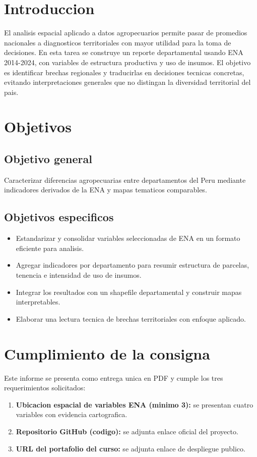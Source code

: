 \documentclass[11pt,a4paper]{article}
\begin{document}
\newpage
\tableofcontents
\newpage

\section{Introduccion}
El analisis espacial aplicado a datos agropecuarios permite pasar de promedios nacionales a diagnosticos territoriales con mayor utilidad para la toma de decisiones. En esta tarea se construye un reporte departamental usando ENA 2014-2024, con variables de estructura productiva y uso de insumos. El objetivo es identificar brechas regionales y traducirlas en decisiones tecnicas concretas, evitando interpretaciones generales que no distingan la diversidad territorial del pais.

\section{Objetivos}
\subsection{Objetivo general}
Caracterizar diferencias agropecuarias entre departamentos del Peru mediante indicadores derivados de la ENA y mapas tematicos comparables.

\subsection{Objetivos especificos}
\begin{itemize}
    \item Estandarizar y consolidar variables seleccionadas de ENA en un formato eficiente para analisis.
    \item Agregar indicadores por departamento para resumir estructura de parcelas, tenencia e intensidad de uso de insumos.
    \item Integrar los resultados con un shapefile departamental y construir mapas interpretables.
    \item Elaborar una lectura tecnica de brechas territoriales con enfoque aplicado.
\end{itemize}

\section{Cumplimiento de la consigna}
Este informe se presenta como entrega unica en PDF y cumple los tres requerimientos solicitados:
\begin{enumerate}
    \item \textbf{Ubicacion espacial de variables ENA (minimo 3):} se presentan cuatro variables con evidencia cartografica.
    \item \textbf{Repositorio GitHub (codigo):} se adjunta enlace oficial del proyecto.
    \item \textbf{URL del portafolio del curso:} se adjunta enlace de despliegue publico.
\end{enumerate}
\end{document}
